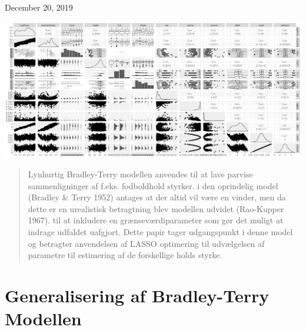 \documentclass[11pt,a4paper]{article}
\renewcommand*\contentsname{Table of Contents}
\begin{document}
\begin{titlepage}
	
	
	\vfill\vfill\vfill %
	
	{\large{December 20, 2019}} %
	
	
	\includegraphics[width=0.8 \textwidth]{kaosmuch.png}\\[1cm] %
	 
	
	\vfill %
	
\end{titlepage}
\renewcommand{\contentsname}{Indholdsfortegnelse}
\clearpage
\tableofcontents
\clearpage
\newpage
{}
\begin{abstract}
Lynhurtig Bradley-Terry modellen anvendes til at lave parvise sammenligninger af f.eks. fodboldhold styrker. i den oprindelig model (Bradley \& Terry 1952) antages at der altid vil være en vinder, men da dette er en urealistisk betragtning blev modellen udvidet (Rao-Kupper 1967). til at inkludere en grænseværdiparameter som gør det muligt at indrage udfaldet uafgjort. Dette papir tager udgangspunkt i denne model og betragter anvendelsen af LASSO optimering til udvælgelsen af parametre til estimering af de forskellige holds styrke. 
\end{abstract}
\section{Generalisering af Bradley-Terry Modellen}
\end{document}
